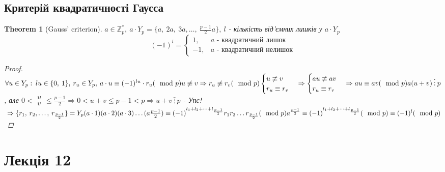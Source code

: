 \documentclass[a4paper,12pt, centered]{bookest}
\newtheorem{theorem}{Theorem}[section]
\begin{document}
\section{Критерій квадратичності Гаусса}
\begin{theorem}[Gauss' criterion]
	$a\in\mathbb{Z}_p^*,\>a\cdot Y_p=\{a,\>2a,\>3a,\dots,\>\frac {p-1}{2}a\},\>l$ - кількість від'ємних лишків у $a\cdot Y_p$
	$$(-1)^l=\left\{\begin{array}{ll}
		1, & a\textrm{ - квадратичний лишок}\\
		-1, & a\textrm{ - квадратичний нелишок}	 
	\end{array}\right.$$
	\begin{proof}
		$\\\forall u\in Y_p:\>lu\in\{0,\>1\},\>r_u\in Y_p,\>a\cdot u\equiv(-1)^{lu}\cdot r_u(\mod p)\\u\not\equiv v\Rightarrow r_u\not\equiv r_v(\mod p)\\\begin{cases}
			u\not\equiv v\\r_u\equiv r_v
		\end{cases}\Rightarrow\begin{cases}
			au\not\equiv av\\r_u\equiv r_v
		\end{cases}\Rightarrow au\equiv av(\mod p)\\a(u+v)\>\vdots\>p$, але $0<\begin{array}{c}
			u\\v 
		\end{array}\leq \frac {p-1}{2}\Rightarrow0<u+v\leq p-1<p\Rightarrow u+v\>\bar{\vdots}\>p$ - Упс!
		$\\\Rightarrow\{r_1,\>r_2,\dots,\>r_{\frac {p-1}{2}}\}=Y_p\\(a\cdot1)(a\cdot2)(a\cdot3)\dots(a\frac {p-1}{2})\equiv(-1)^{l_1+l_2+\dots+l_{\frac {p-1}{2}}}r_1r_2\dots r_{\frac {p-1}{2}}(\mod p)\\a^{\frac {p-1}{2}}\equiv(-1)^{l_1+l_2+\dots+l_{\frac {p-1}{2}}}(\mod p)\equiv(-1)^l(\mod p)$
	\end{proof}
\end{theorem}
\chapter{Лекція 12                                                                                                                                                                   }
\end{document}
